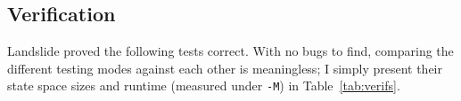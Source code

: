\subsection{Verification}
\label{sec:tm-verif}

Landslide proved the following tests correct.
With no bugs to find, comparing the different testing modes against each other is meaningless;
I simply present their state space sizes and runtime
(measured under {\tt -M})
in Table~\ref{tab:verifs}.



